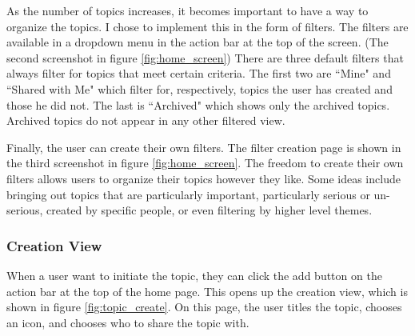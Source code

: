       As the number of topics increases,
      it becomes important to have a way to organize the topics.
      I chose to implement this in the form of filters.
      The filters are available in a dropdown menu in the action bar at the top of the screen.
      (The second screenshot in figure \ref{fig:home_screen})
      There are three default filters that always filter for topics that meet certain criteria.
      The first two are ``Mine" and ``Shared with Me"
      which filter for, respectively, topics the user has created and those he did not.
      The last is ``Archived" which shows only the archived topics.
      Archived topics do not appear in any other filtered view.

      Finally, the user can create their own filters.
      The filter creation page is shown in the third screenshot in figure \ref{fig:home_screen}.
      The freedom to create their own filters allows users to organize
      their topics however they like.
      Some ideas include bringing out topics that are particularly important,
      particularly serious or un-serious, created by specific people,
      or even filtering by higher level themes.

      \subsubsection{Creation View}
      When a user want to initiate the topic,
      they can click the add button on the action bar at the top of the home page.
      This opens up the creation view, which is shown in figure \ref{fig:topic_create}.
      On this page, the user titles the topic,
      chooses an icon, and chooses who to share the topic with.

